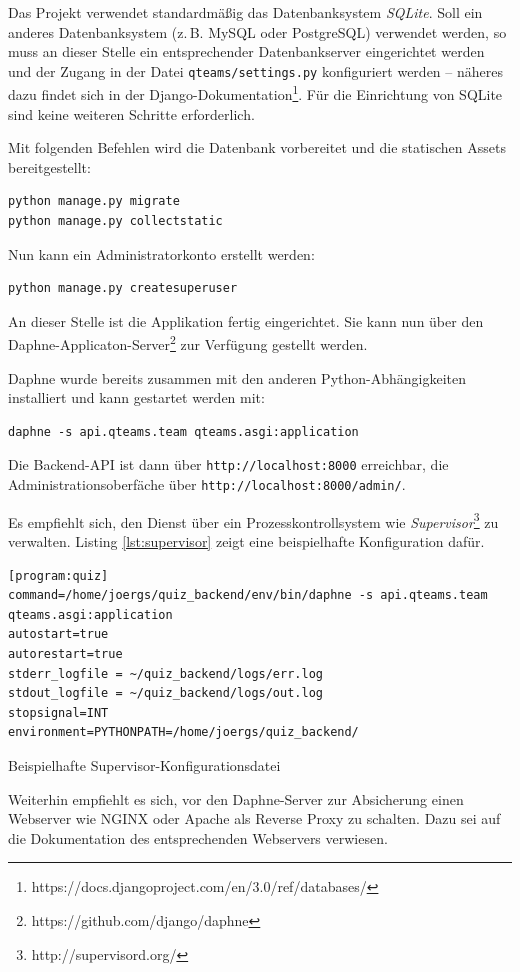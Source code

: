 \documentclass[a4paper,11pt,listof=numbered,glossary=totoc,parskip=half,toc=bib]{scrreprt}
\begin{document}
\begin{appendices}
	Das Projekt verwendet standardmäßig das Datenbanksystem \textit{SQLite}. Soll ein anderes Datenbanksystem (z.\,B. MySQL oder PostgreSQL) verwendet werden, so muss an dieser Stelle ein entsprechender Datenbankserver eingerichtet werden und der Zugang in der Datei \texttt{qteams/settings.py} konfiguriert werden -- näheres dazu findet sich in der Django-Dokumentation\footnote{https://docs.djangoproject.com/en/3.0/ref/databases/}. Für die Einrichtung von SQLite sind keine weiteren Schritte erforderlich.
	
	Mit folgenden Befehlen wird die Datenbank vorbereitet und die statischen Assets bereitgestellt:
	
	\begin{verbatim}
python manage.py migrate
python manage.py collectstatic
	\end{verbatim}
	
	Nun kann ein Administratorkonto erstellt werden:
	
	\begin{verbatim}
python manage.py createsuperuser
	\end{verbatim}
	
	An dieser Stelle ist die Applikation fertig eingerichtet. Sie kann nun über den Daphne-Applicaton-Server\footnote{https://github.com/django/daphne} zur Verfügung gestellt werden. 
	
	Daphne wurde bereits zusammen mit den anderen Python-Abhängigkeiten installiert und kann gestartet werden mit:
	
	\begin{verbatim}
daphne -s api.qteams.team qteams.asgi:application
	\end{verbatim}
	
	Die Backend-API ist dann über \texttt{http://localhost:8000} erreichbar, die Administrationsoberfäche über \texttt{http://localhost:8000/admin/}.
	
	Es empfiehlt sich, den Dienst über ein Prozesskontrollsystem wie \textit{Supervisor}\footnote{http://supervisord.org/} zu verwalten. Listing \ref{lst:supervisor} zeigt eine beispielhafte Konfiguration dafür.
	
	\begin{listing}
		\begin{verbatim}
[program:quiz]
command=/home/joergs/quiz_backend/env/bin/daphne -s api.qteams.team qteams.asgi:application
autostart=true
autorestart=true
stderr_logfile = ~/quiz_backend/logs/err.log
stdout_logfile = ~/quiz_backend/logs/out.log
stopsignal=INT
environment=PYTHONPATH=/home/joergs/quiz_backend/
		\end{verbatim}
		\caption{Beispielhafte Supervisor-Konfigurationsdatei}
		\label{lst:supervisor}
	\end{listing}
	
	Weiterhin empfiehlt es sich, vor den Daphne-Server zur Absicherung einen Webserver wie NGINX oder Apache als Reverse Proxy zu schalten. Dazu sei auf die Dokumentation des entsprechenden Webservers verwiesen.
	

	
	\end{appendices}
	\newpage	
	\setcounter{chapter}{\thelastRomanCounter} %
\renewcommand \thechapter{\Roman{chapter}}	\printbibliography[heading=bibnumbered,title=Literaturverzeichnis]
\end{document}
